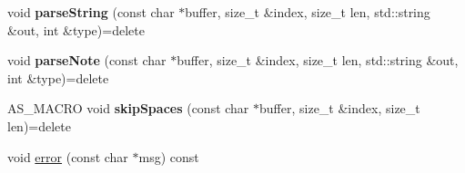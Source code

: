 \begin{DoxyCompactItemize}
\item 
\mbox{\label{class_lexical_parser_a79dea8c601ecea47d20f3311aeab25ac}} 
void {\bfseries parse\+String} (const char $\ast$buffer, size\+\_\+t \&index, size\+\_\+t len, std\+::string \&out, int \&type)=delete
\item 
\mbox{\label{class_lexical_parser_acce8093e7ff136520d7f7ab1dd4fa7ac}} 
void {\bfseries parse\+Note} (const char $\ast$buffer, size\+\_\+t \&index, size\+\_\+t len, std\+::string \&out, int \&type)=delete
\item 
\mbox{\label{class_lexical_parser_ad81309f70f2e05f939e656e0e23cbb05}} 
A\+S\+\_\+\+M\+A\+C\+RO void {\bfseries skip\+Spaces} (const char $\ast$buffer, size\+\_\+t \&index, size\+\_\+t len)=delete
\item 
void \hyperlink{class_lexical_parser_ac9fe754e7346c2bdebbe868ee2db1308}{error} (const char $\ast$msg) const
\end{DoxyCompactItemize}
